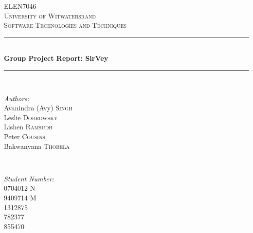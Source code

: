 \documentclass[12pt]{witseiepaper}
\begin{document}
\begin{titlepage}
  
  \newcommand{\HRule}{\rule{\linewidth}{0.5mm}} 
  
  \begin{center}
    
    \textsc{\LARGE ELEN7046}\\[1.5cm]
    
    \textsc{\Large University of Witwatersrand}\\[0.5cm]
    
    \textsc{\large Software Technologies and Techniques}\\[0.5cm]
    
    \HRule \\[0.4cm]
    { \huge \bfseries Group Project Report: SirVey}\\[0.5cm]
    
    \HRule \\[1.5cm]
    \begin{minipage}
      {0.4
      \textwidth} 
      \begin{flushleft}
        \large \emph{Authors:}\\
        Avanindra (Avy) \textsc{Singh} \\
        Leslie \textsc{Dobrowsky} \\
        Lishen \textsc{Ramsudh} \\
        Peter \textsc{Cousins} \\
        Bakwanyana \textsc{Thobela} \\

        
      \end{flushleft}
    \end{minipage}
    ~ 
    \begin{minipage}
      {0.4
      \textwidth} 
      \begin{flushright}
        \large \emph{Student Number:} \\
        0704012 \textsc{N} \\
        9409714 \textsc{M}  \\
        1312875 \\
        782377  \\
        855470
      \end{flushright}
    \end{minipage}
    \\[2cm]
    

\end{center}
\end{titlepage}
\end{document}
